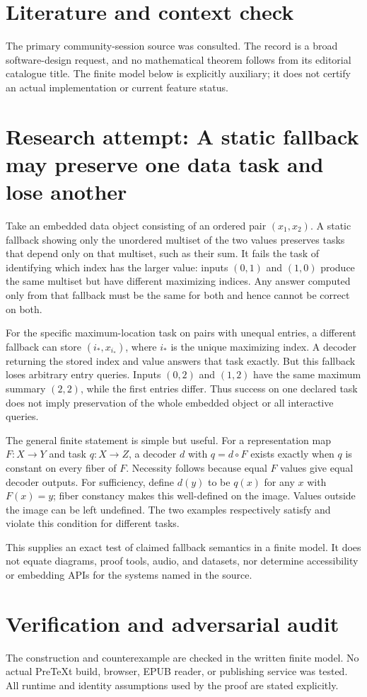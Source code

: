 \documentclass[11pt]{article}
\begin{document}
\section{Literature and context check}
The primary community-session source was consulted. The record is a broad software-design request, and no mathematical theorem follows from its editorial catalogue title. The finite model below is explicitly auxiliary; it does not certify an actual implementation or current feature status.
\section{Research attempt: A static fallback may preserve one data task and lose another}
Take an embedded data object consisting of an ordered pair $(x_1,x_2)$. A static fallback showing only the unordered multiset of the two values preserves tasks that depend only on that multiset, such as their sum. It fails the task of identifying which index has the larger value: inputs $(0,1)$ and $(1,0)$ produce the same multiset but have different maximizing indices. Any answer computed only from that fallback must be the same for both and hence cannot be correct on both.

For the specific maximum-location task on pairs with unequal entries, a different fallback can store $(i_*,x_{i_*})$, where $i_*$ is the unique maximizing index. A decoder returning the stored index and value answers that task exactly. But this fallback loses arbitrary entry queries. Inputs $(0,2)$ and $(1,2)$ have the same maximum summary $(2,2)$, while the first entries differ. Thus success on one declared task does not imply preservation of the whole embedded object or all interactive queries.

The general finite statement is simple but useful. For a representation map $F:X\to Y$ and task $q:X\to Z$, a decoder $d$ with $q=d\circ F$ exists exactly when $q$ is constant on every fiber of $F$. Necessity follows because equal $F$ values give equal decoder outputs. For sufficiency, define $d(y)$ to be $q(x)$ for any $x$ with $F(x)=y$; fiber constancy makes this well-defined on the image. Values outside the image can be left undefined. The two examples respectively satisfy and violate this condition for different tasks.

This supplies an exact test of claimed fallback semantics in a finite model. It does not equate diagrams, proof tools, audio, and datasets, nor determine accessibility or embedding APIs for the systems named in the source.
\section{Verification and adversarial audit}
The construction and counterexample are checked in the written finite model. No actual PreTeXt build, browser, EPUB reader, or publishing service was tested. All runtime and identity assumptions used by the proof are stated explicitly.
\end{document}
